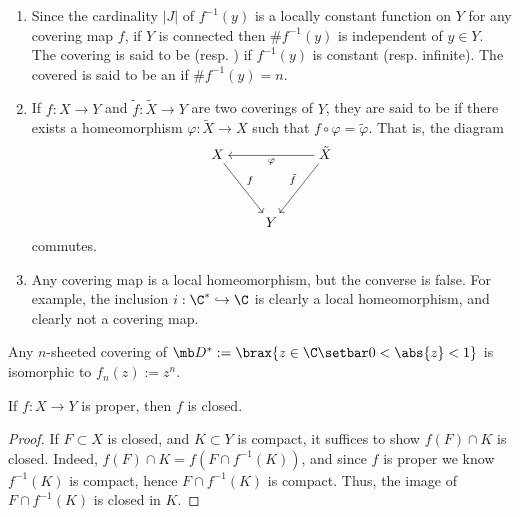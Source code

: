 \documentclass[11pt]{report}
\begin{document}
\begin{rmk}
    \begin{enumerate}
        \item Since the cardinality $|J|$ of $f^{-1}(y)$ is a locally constant function on $Y$ for any covering map $f$, if $Y$ is connected then $\# f^{-1}(y)$ is independent of $y \in Y$. The covering is said to be  (resp. ) if $f^{-1}(y)$ is constant (resp. infinite). The covered is said to be an  if $\#f^{-1}(y) = n$.
        \item If $f:X \to Y$ and $\tilde f:\tilde X \to Y$ are two coverings of $Y$, they are said to be  if there exists a homeomorphism $\varphi :\tilde X \to X$ such that $f \circ \varphi = \tilde \varphi$. That is, the diagram
\[\begin{tikzcd}[ampersand replacement=\&,cramped]
	X \&\& {\tilde X} \\
	\\
	\& Y
	\arrow["f", from=1-1, to=3-2]
	\arrow["\varphi", from=1-3, to=1-1]
	\arrow["{\tilde f}"', from=1-3, to=3-2]
\end{tikzcd}\]
commutes.
\item Any covering map is a local homeomorphism, but the converse is false. For example, the inclusion $i : \C^* \hookrightarrow \C$ is clearly a local homeomorphism, and clearly not a covering map.
    \end{enumerate}
\end{rmk}

\begin{ex}
    Any $n$-sheeted covering of $\mb D^*:= \brax{z \in \C \setbar 0 < \abs{z} < 1}$ is isomorphic to $f_n(z):=z^n$.
\end{ex}

\begin{lem}[][label=lem:proper_closed]
    If $f:X \to Y$ is proper, then $f$ is closed.
\end{lem}

\begin{proof}
    If $F \subset X$ is closed, and $K \subset Y$ is compact, it suffices to show $f(F) \cap K$ is closed. Indeed, $f(F) \cap K = f(F \cap f^{-1}(K))$, and since $f$ is proper we know $f^{-1}(K)$ is compact, hence $F \cap f^{-1}(K)$ is compact. Thus, the image of $F \cap f^{-1}(K)$ is closed in $K$.
\end{proof}
\end{document}
